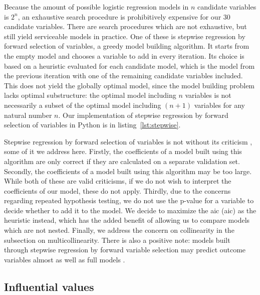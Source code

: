 Because the amount of possible logistic regression models in $n$ candidate variables is $2^n$, an exhaustive search procedure is prohibitively expensive for our 30 candidate variables.
There are search procedures which are not exhaustive, but still yield serviceable models in practice.
One of these is stepwise regression by forward selection of variables, a greedy \citep{DBLP:books/daglib/0023376} model building algorithm.
It starts from the empty model and chooses a variable to add in every iteration.
Its choice is based on a heuristic evaluated for each candidate model, which is the model from the previous iteration with one of the remaining candidate variables included.
This does not yield the globally optimal model, since the model building problem lacks optimal substructure: the optimal model including $n$ variables is not necessarily a subset of the optimal model including $(n + 1)$ variables for any natural number $n$.
Our implementation of stepwise regression by forward selection of variables in Python is in listing~\ref{lst:stepwise}.

Stepwise regression by forward selection of variables is not without its criticism \citep{altman1989bootstrap,doi:10.1080/00401706.1970.10488701,doi:10.1080/00031305.1990.10475722,https://doi.org/10.1111/j.2044-8317.1992.tb00992.x,tibshirani1996regression,copas1983regression}, some of it we address here.
Firstly, the coefficients of a model built using this algorithm are only correct if they are calculated on a separate validation set.
Secondly, the coefficients of a model built using this algorithm may be too large.
While both of these are valid criticisms, if we do not wish to interpret the coefficients of our model, these do not apply.
Thirdly, due to the concerns regarding repeated hypothesis testing, we do not use the p-value for a variable to decide whether to add it to the model.
We decide to maximize the \acrlong{aic} (\acrshort{aic}) \citep{Akaike1998} as the heuristic instead, which has the added benefit of allowing us to compare models which are not nested.
Finally, we address the concern on collinearity in the subsection on multicollinearity.
There is also a positive note: models built through stepwise regression by forward variable selection may predict outcome variables almost as well as full models \citep{roecker1991prediction}.

\subsection{Influential values}

